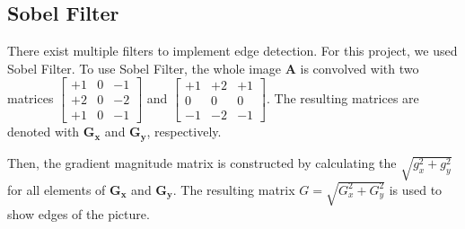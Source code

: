 \documentclass[12pt]{article}
\begin{document}
\subsection{Sobel Filter}
There exist multiple filters to implement edge detection. For this project, we used Sobel Filter. To use Sobel Filter, the whole image $\mathbf{A}$ is convolved with two matrices $\left[\begin{array}{rrr}+1 & 0 & -1 \\ +2 & 0 & -2 \\ +1 & 0 & -1\end{array}\right]$ and $\left[\begin{array}{ccc}+1 & +2 & +1 \\ 0 & 0 & 0 \\ -1 & -2 & -1\end{array}\right]$. The resulting matrices are denoted with $\mathbf{G_x}$ and $\mathbf{G_y}$, respectively.

Then, the gradient magnitude matrix is constructed by calculating the $\sqrt{g^2_x + g^2_y}$ for all elements of $\mathbf{G_x}$ and $\mathbf{G_y}$. The resulting matrix $G = \sqrt{G^2_x + G^2_y}$ is used to show edges of the picture.

 


\newpage


	
	
	
	
\end{document}
